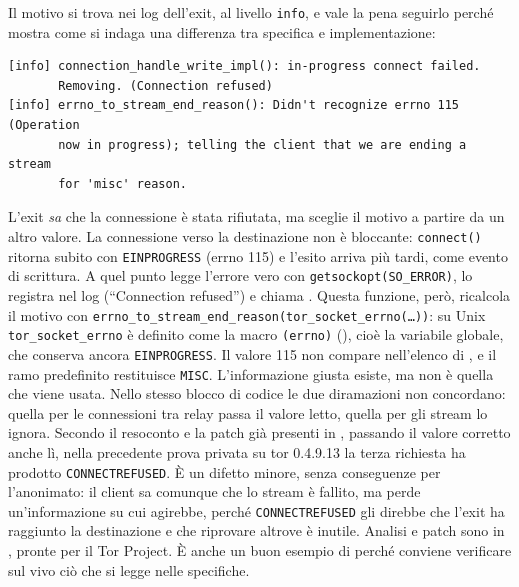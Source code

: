 \begin{approfondimento}
Il motivo si trova nei log dell'exit, al livello \texttt{info}, e vale la pena seguirlo perché mostra come si indaga una differenza tra specifica e implementazione:
\begin{lstlisting}[numbers=none]
[info] connection_handle_write_impl(): in-progress connect failed.
       Removing. (Connection refused)
[info] errno_to_stream_end_reason(): Didn't recognize errno 115 (Operation
       now in progress); telling the client that we are ending a stream
       for 'misc' reason.
\end{lstlisting}
L'exit \emph{sa} che la connessione è stata rifiutata, ma sceglie il motivo a partire da un altro valore. La connessione verso la destinazione non è bloccante: \texttt{connect()} ritorna subito con \texttt{EINPROGRESS} (errno 115) e l'esito arriva più tardi, come evento di scrittura. A quel punto  legge l'errore vero con \texttt{getsockopt(SO\_ERROR)}, lo registra nel log (\enquote{Connection refused}) e chiama . Questa funzione, però, ricalcola il motivo con \texttt{errno\_to\_stream\_end\_reason(tor\_socket\_errno(\ldots))}: su Unix \texttt{tor\_socket\_errno} è definito come la macro \texttt{(errno)} (), cioè la variabile globale, che conserva ancora \texttt{EINPROGRESS}. Il valore 115 non compare nell'elenco di , e il ramo predefinito restituisce \texttt{MISC}. L'informazione giusta esiste, ma non è quella che viene usata. Nello stesso blocco di codice le due diramazioni non concordano: quella per le connessioni tra relay passa il valore letto, quella per gli stream lo ignora. Secondo il resoconto e la patch già presenti in , passando il valore corretto anche lì, nella precedente prova privata su tor 0.4.9.13 la terza richiesta ha prodotto \texttt{CONNECTREFUSED}. È un difetto minore, senza conseguenze per l'anonimato: il client sa comunque che lo stream è fallito, ma perde un'informazione su cui agirebbe, perché \texttt{CONNECTREFUSED} gli direbbe che l'exit ha raggiunto la destinazione e che riprovare altrove è inutile. Analisi e patch sono in , pronte per il Tor Project. È anche un buon esempio di perché conviene verificare sul vivo ciò che si legge nelle specifiche.
\end{approfondimento}

